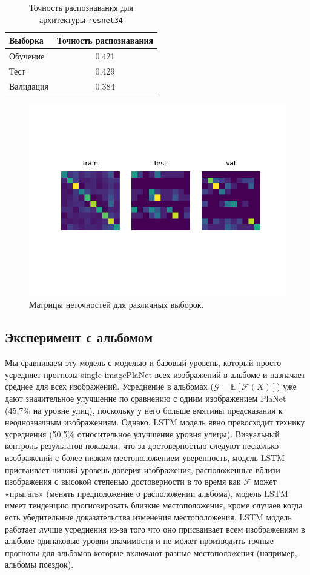 \begin{table}
	\centering
\begin{tabu} {l|c}
Выборка& Точность распознавания	\\ \hline
Обучение&0.421 \\
Тест&  0.429 \\
Валидация& 0.384 \\\hline
\end{tabu}
\caption{Точность распознавания для архитектуры \texttt{resnet34}}
\label{tbl:acc}
\end{table}



\begin{figure}[h]
	\centering
	\includegraphics[width=0.7\linewidth]{img/confM}
	\caption{Матрицы неточностей для различных выборок.}
	\label{fig:confm}
\end{figure}


\subsection{Эксперимент с альбомом} 

Мы сравниваем эту модель с моделью и базовый уровень, который просто усредняет прогнозы single-imagePlaNet всех изображений в альбоме и назначает
среднее для всех изображений. Усреднение в альбомах ($ \mathcal{G}= \mathbb{E}[ \mathcal{F}(X) ] $) уже
дают значительное улучшение по сравнению с одним изображением PlaNet
(45,7\% на уровне улиц), поскольку у него больше
вмятины предсказания к неоднозначным изображениям. Однако, LSTM
модель явно превосходит технику усреднения (50,5\%
относительное улучшение уровня улицы). Визуальный контроль
результатов показали, что за достоверностью следуют несколько изображений с более низким местоположением уверенность, модель LSTM присваивает низкий уровень доверия изображения, расположенные вблизи изображения с высокой степенью достоверности в то время как $ \mathcal{F} $ может «прыгать» (менять предположение о расположении альбома), модель LSTM имеет тенденцию прогнозировать близкие местоположения, кроме случаев когда есть убедительные доказательства изменения местоположения. LSTM модель работает лучше усреднения из-за того что оно присваивает всем изображениям в альбоме одинаковые уровни значимости и не может производить точные прогнозы для альбомов которые включают разные местоположения (например, альбомы поездок).


